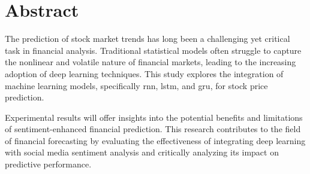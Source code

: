 \clearpage
\pagestyle{empty} 

\section*{Abstract}

The prediction of stock market trends has long been a challenging yet critical task in 
financial analysis. Traditional statistical models often struggle to capture the nonlinear 
and volatile nature of financial markets, leading to the increasing adoption of deep learning 
techniques. This study explores the integration of machine learning models, specifically 
\acrfull{rnn}, \acrfull{lstm}, and \acrfull{gru}, for stock price prediction.

Experimental results will offer insights into the potential benefits and limitations of 
sentiment-enhanced financial prediction. This research contributes to the field of financial 
forecasting by evaluating the effectiveness of integrating deep learning with social media 
sentiment analysis and critically analyzing its impact on predictive performance.


